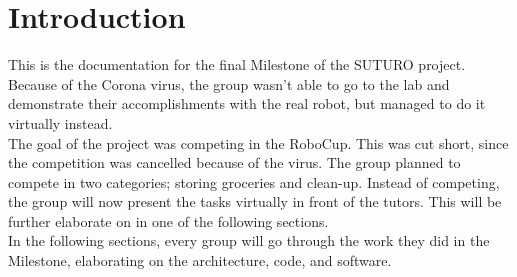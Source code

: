 \documentclass[main.tex]{subfiles}
\begin{document}
	\chapter{Introduction}

This is the documentation for the final Milestone of the SUTURO project. Because of the Corona virus, the group wasn't able to go to the lab and demonstrate their accomplishments with the real robot, but managed to do it virtually instead.\\
The goal of the project was competing in the RoboCup. This was cut short, since the competition was cancelled because of the virus. The group planned to compete in two categories; storing groceries and clean-up. Instead of competing, the group will now present the tasks virtually in front of the tutors. This will be further elaborate on in one of the following sections.\\
In the following sections, every group will go through the work they did in the Milestone, elaborating on the architecture, code, and software.
	
\end{document}
